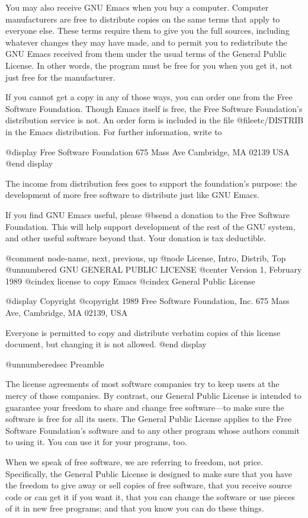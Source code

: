 You may also receive GNU Emacs when you buy a computer.  Computer
manufacturers are free to distribute copies on the same terms that apply to
everyone else.  These terms require them to give you the full sources,
including whatever changes they may have made, and to permit you to
redistribute the GNU Emacs received from them under the usual terms of the
General Public License.  In other words, the program must be free for you
when you get it, not just free for the manufacturer.

If you cannot get a copy in any of those ways, you can order one from
the Free Software Foundation.  Though Emacs itself is free, the Free
Software Foundation's distribution service is not.  An order form is
included in the file @file{etc/DISTRIB} in the Emacs distribution.
For further information, write to

@display
Free Software Foundation
675 Mass Ave
Cambridge, MA 02139
USA
@end display

The income from distribution fees goes to support the foundation's
purpose: the development of more free software to distribute just like
GNU Emacs.

If you find GNU Emacs useful, please @b{send a donation} to the Free
Software Foundation.  This will help support development of the rest of the
GNU system, and other useful software beyond that.  Your donation is tax
deductible.

@comment  node-name,  next,  previous,  up
@node License, Intro, Distrib, Top
@unnumbered GNU GENERAL PUBLIC LICENSE
@center Version 1, February 1989
@cindex license to copy Emacs
@cindex General Public License

@display
Copyright @copyright{} 1989 Free Software Foundation, Inc.
675 Mass Ave, Cambridge, MA 02139, USA

Everyone is permitted to copy and distribute verbatim copies
of this license document, but changing it is not allowed.
@end display

@unnumberedsec Preamble

  The license agreements of most software companies try to keep users
at the mercy of those companies.  By contrast, our General Public
License is intended to guarantee your freedom to share and change free
software---to make sure the software is free for all its users.  The
General Public License applies to the Free Software Foundation's
software and to any other program whose authors commit to using it.
You can use it for your programs, too.

  When we speak of free software, we are referring to freedom, not
price.  Specifically, the General Public License is designed to make
sure that you have the freedom to give away or sell copies of free
software, that you receive source code or can get it if you want it,
that you can change the software or use pieces of it in new free
programs; and that you know you can do these things.

